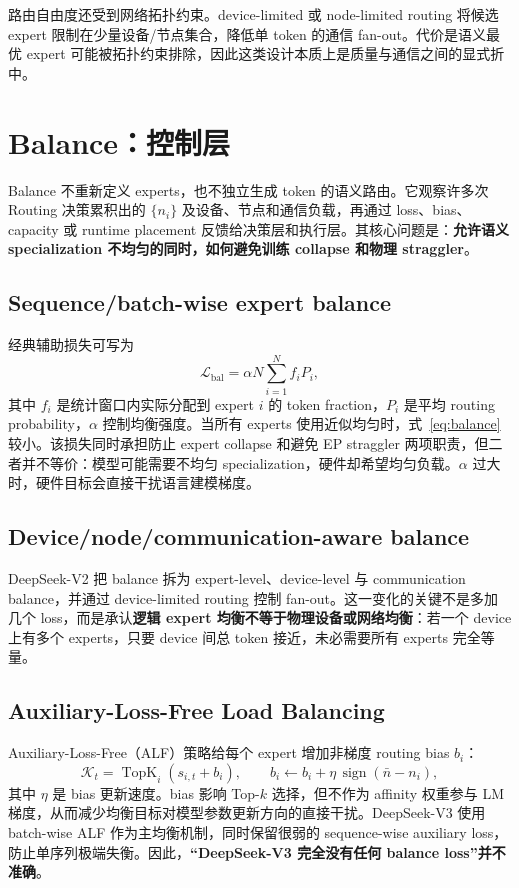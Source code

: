 \documentclass[10pt,a4paper,fontset=none]{ctexart}
\newcommand{\term}[1]{\textbf{#1}}
\begin{document}
路由自由度还受到网络拓扑约束。device-limited 或 node-limited routing 将候选 expert 限制在少量设备/节点集合，降低单 token 的通信 fan-out。代价是语义最优 expert 可能被拓扑约束排除，因此这类设计本质上是质量与通信之间的显式折中。

\section{Balance：控制层}

Balance 不重新定义 experts，也不独立生成 token 的语义路由。它观察许多次 Routing 决策累积出的 $\{n_i\}$ 及设备、节点和通信负载，再通过 loss、bias、capacity 或 runtime placement 反馈给决策层和执行层。其核心问题是：\term{允许语义 specialization 不均匀的同时，如何避免训练 collapse 和物理 straggler}。

\subsection{Sequence/batch-wise expert balance}

经典辅助损失可写为
\begin{equation}
  \mathcal{L}_{\mathrm{bal}}=\alpha N\sum_{i=1}^{N} f_i P_i,
  \label{eq:balance}
\end{equation}
其中 $f_i$ 是统计窗口内实际分配到 expert $i$ 的 token fraction，$P_i$ 是平均 routing probability，$\alpha$ 控制均衡强度。当所有 experts 使用近似均匀时，式~\eqref{eq:balance}较小。该损失同时承担防止 expert collapse 和避免 EP straggler 两项职责，但二者并不等价：模型可能需要不均匀 specialization，硬件却希望均匀负载。$\alpha$ 过大时，硬件目标会直接干扰语言建模梯度。

\subsection{Device/node/communication-aware balance}

DeepSeek-V2 把 balance 拆为 expert-level、device-level 与 communication balance，并通过 device-limited routing 控制 fan-out\cite{deepseekv2}。这一变化的关键不是多加几个 loss，而是承认\term{逻辑 expert 均衡不等于物理设备或网络均衡}：若一个 device 上有多个 experts，只要 device 间总 token 接近，未必需要所有 experts 完全等量。

\subsection{Auxiliary-Loss-Free Load Balancing}

Auxiliary-Loss-Free（ALF）策略给每个 expert 增加非梯度 routing bias $b_i$：
\begin{equation}
  \mathcal{K}_t=\operatorname{TopK}_i(s_{i,t}+b_i),\qquad
  b_i\leftarrow b_i+\eta\,\operatorname{sign}(\bar n-n_i),
  \label{eq:alf}
\end{equation}
其中 $\eta$ 是 bias 更新速度。bias 影响 Top-$k$ 选择，但不作为 affinity 权重参与 LM 梯度，从而减少均衡目标对模型参数更新方向的直接干扰\cite{wang2024auxfree}。DeepSeek-V3 使用 batch-wise ALF 作为主均衡机制，同时保留很弱的 sequence-wise auxiliary loss，防止单序列极端失衡\cite{deepseekv3}。因此，\term{“DeepSeek-V3 完全没有任何 balance loss”并不准确}。
\end{document}
